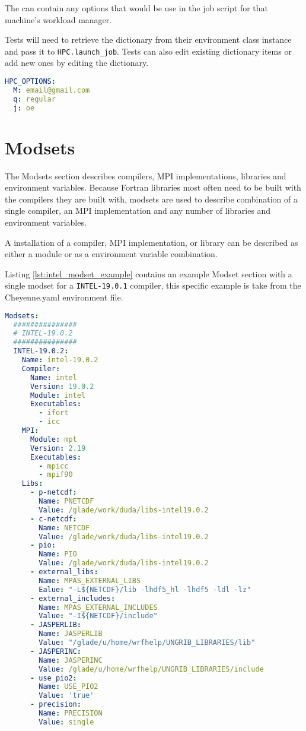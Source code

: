 The \hpcoptions can contain any options that would be use in the job script for
that machine's workload manager.

Tests will need to retrieve the \hpcoptions dictionary from their environment
class instance and pass it to {\tt HPC.launch\_job}. Tests can also edit
existing dictionary items or add new ones by editing the \hpcoptions
dictionary.

\begin{lstlisting}[language=yaml, 
                   caption={Examlpe HPC\_Options},
                   label={lst:hpc_options}]
HPC_OPTIONS:
  M: email@gmail.com 
  q: regular
  j: oe
\end{lstlisting}

\section{Modsets}
\label{sec:modsets}

The Modsets section describes compilers, MPI implementations, libraries and
environment variables. Because Fortran libraries most often need to be built
with the compilers they are built with, modsets are used to describe
combination of a single compiler, an MPI implementation and any number of
libraries and environment variables.

A installation of a compiler, MPI implementation, or library can be described
as either a module or as a environment variable combination. 

Listing \ref{lst:intel_modset_example} contains an example Modset section with
a single modset for a {\tt INTEL-19.0.1} compiler, this specific example is
take from the Cheyenne.yaml environment file.

\begin{lstlisting}[language=yaml, 
                   caption={Example Cheyenne Intel Modset},
                   label={lst:intel_modset_example}]
Modsets:
  ###############
  # INTEL-19.0.2
  ###############
  INTEL-19.0.2:
    Name: intel-19.0.2
    Compiler:
      Name: intel
      Version: 19.0.2
      Module: intel
      Executables:
        - ifort
        - icc
    MPI:
      Module: mpt
      Version: 2.19
      Executables:
        - mpicc
        - mpif90
    Libs:
      - p-netcdf:
        Name: PNETCDF
        Value: /glade/work/duda/libs-intel19.0.2
      - c-netcdf:
        Name: NETCDF
        Value: /glade/work/duda/libs-intel19.0.2
      - pio:
        Name: PIO
        Value: /glade/work/duda/libs-intel19.0.2
      - external_libs:
        Name: MPAS_EXTERNAL_LIBS
        Ealue: "-L${NETCDF}/lib -lhdf5_hl -lhdf5 -ldl -lz"
      - external_includes:
        Name: MPAS_EXTERNAL_INCLUDES
        Value: "-I${NETCDF}/include"
      - JASPERLIB:
        Name: JASPERLIB
        Value: "/glade/u/home/wrfhelp/UNGRIB_LIBRARIES/lib"
      - JASPERINC:
        Name: JASPERINC
        Value: /glade/u/home/wrfhelp/UNGRIB_LIBRARIES/include
      - use_pio2:
        Name: USE_PIO2
        Value: 'true'
      - precision:
        Name: PRECISION
        Value: single
\end{lstlisting}

